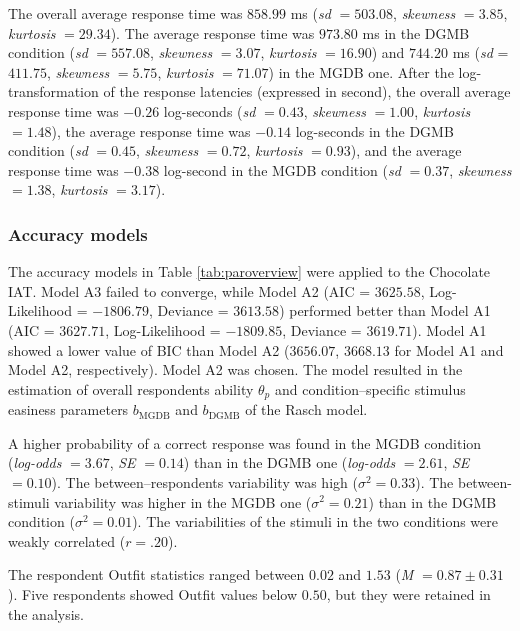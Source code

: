 \documentclass[12pt]{book}
\begin{document}
The overall average response time was $858.99$ ms (\emph{sd} $= 503.08$, \emph{skewness} $= 3.85$, \emph{kurtosis} $= 29.34$). The average response time was $973.80$ ms in the DGMB condition (\emph{sd} $= 557.08$, \emph{skewness} $= 3.07$, \emph{kurtosis} $= 16.90$) and $744.20$ ms (\emph{sd} = $411.75$, \emph{skewness} $= 5.75$, \emph{kurtosis} $= 71.07$) in the MGDB one. 
After the log-transformation of the response latencies (expressed in second), the overall average response time was $-0.26$ log-seconds (\emph{sd} $= 0.43$, \emph{skewness} $= 1.00$, \emph{kurtosis} $= 1.48$), the average response time was $-0.14$ log-seconds in the DGMB condition (\emph{sd} $= 0.45$, \emph{skewness} $= 0.72$, \emph{kurtosis} $= 0.93$), and the average response time  was $-0.38$ log-second in the MGDB condition (\emph{sd} $= 0.37$, \emph{skewness} $= 1.38$, \emph{kurtosis} $= 3.17$).

\subsubsection{Accuracy models}\label{sub:chocolateRasch}
The accuracy models in Table \ref{tab:paroverview} were applied to the Chocolate IAT. 
Model A3 failed to converge, while Model A2 (AIC = $3625.58$, Log-Likelihood = $-1806.79$, Deviance = $3613.58$) performed better than Model A1 (AIC = $3627.71$, Log-Likelihood  = $-1809.85$, Deviance  = $3619.71$). Model A1 showed a lower value of BIC than Model A2 ($3656.07$, $3668.13$ for Model A1 and Model A2, respectively). Model A2 was chosen. The model resulted in the estimation of overall respondents ability $\theta_p$ and condition--specific stimulus easiness parameters $b_{\text{MGDB}}$ and $b_{\text{DGMB}}$ of the Rasch model.

A higher probability of a correct response was found in the MGDB condition (\emph{log-odds} $= 3.67$, \emph{SE} $= 0.14$) than in the DGMB one (\emph{log-odds} $= 2.61$, \emph{SE} $= 0.10$). 
The between--respondents variability was high ($\sigma^2 = 0.33$). The between-stimuli variability was higher in the MGDB one ($\sigma^2 = 0.21$) than in the DGMB condition ($\sigma^2 = 0.01$). The variabilities of the stimuli in the two conditions were weakly correlated  ($r = .20$). 

The respondent Outfit statistics ranged between $0.02$ and $1.53$ (\emph{M} $= 0.87 \pm 0.31$). Five respondents showed Outfit values below $0.50$, but they were retained in the analysis.
\end{document}
